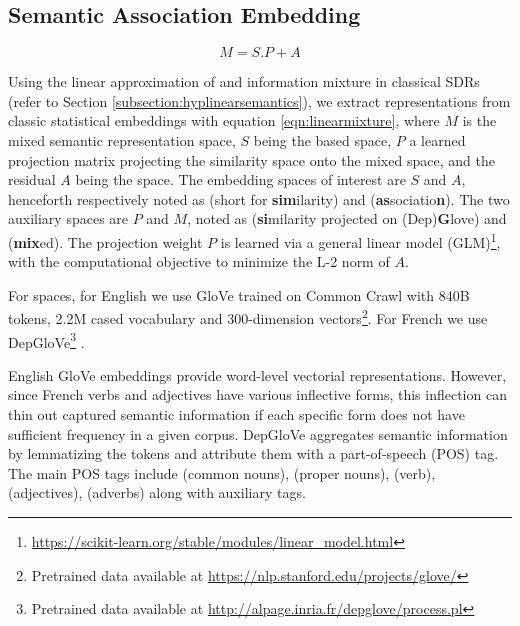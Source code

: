 
\subsection{Semantic Association Embedding}


\begin{equation}
    M = S.P + A 
    \label{eqn:linearmixture}
    \end{equation}

Using the linear approximation of \similarity and \association information mixture in classical SDRs (refer to Section \ref{subsection:hyplinearsemantics}), we extract \association representations from classic statistical embeddings with equation \ref{eqn:linearmixture}, where \(M\) is the mixed semantic representation space, \(S\) being the \similarity based space, \(P\) a learned projection matrix projecting the similarity space onto the mixed space, and the residual \(A\) being the \association space. The embedding spaces of interest are \(S\) and \(A\), henceforth respectively noted as (short for \textbf{sim}ilarity) and  (\textbf{as}sociatio\textbf{n}). The two auxiliary spaces are \(P\) and \(M\), noted as  (\textbf{si}milarity projected on (Dep)\textbf{G}love) and  (\textbf{mix}ed). The projection weight \(P\) is learned via a general linear model (GLM)\footnote{\url{https://scikit-learn.org/stable/modules/linear_model.html}}, with the computational objective to minimize the L-2 norm of \(A\).

For  spaces, for English we use GloVe \parencite{penningtonGloveGlobalVectors2014} trained on Common Crawl with 840B tokens, 2.2M cased vocabulary and 300-dimension vectors\footnote{Pretrained data available at \url{https://nlp.stanford.edu/projects/glove/}}. For French we use DepGloVe\footnote{Pretrained data available at \url{http://alpage.inria.fr/depglove/process.pl}} \parencite{delaclergerieDepGloveSmallServer}. 

English GloVe embeddings provide word-level vectorial representations. However, since French verbs and adjectives have various inflective forms, this inflection can thin out captured semantic information if each specific form does not have sufficient frequency in a given corpus. DepGloVe aggregates semantic information by lemmatizing the tokens and attribute them with a part-of-speech (POS) tag. The main POS tags include  (common nouns),  (proper nouns),  (verb),  (adjectives),  (adverbs) along with auxiliary tags.

